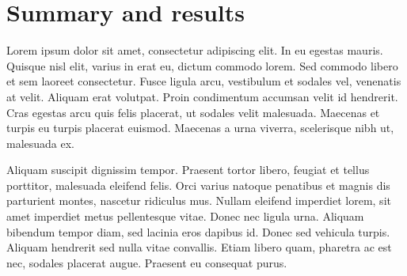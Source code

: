 \chapter{Summary and results}
\label{ch:sum}

Lorem ipsum dolor sit amet, consectetur adipiscing elit. In eu egestas mauris. Quisque nisl elit, varius in erat eu, dictum commodo lorem. Sed commodo libero et sem laoreet consectetur. Fusce ligula arcu, vestibulum et sodales vel, venenatis at velit. Aliquam erat volutpat. Proin condimentum accumsan velit id hendrerit. Cras egestas arcu quis felis placerat, ut sodales velit malesuada. Maecenas et turpis eu turpis placerat euismod. Maecenas a urna viverra, scelerisque nibh ut, malesuada ex.

Aliquam suscipit dignissim tempor. Praesent tortor libero, feugiat et tellus porttitor, malesuada eleifend felis. Orci varius natoque penatibus et magnis dis parturient montes, nascetur ridiculus mus. Nullam eleifend imperdiet lorem, sit amet imperdiet metus pellentesque vitae. Donec nec ligula urna. Aliquam bibendum tempor diam, sed lacinia eros dapibus id. Donec sed vehicula turpis. Aliquam hendrerit sed nulla vitae convallis. Etiam libero quam, pharetra ac est nec, sodales placerat augue. Praesent eu consequat purus.
